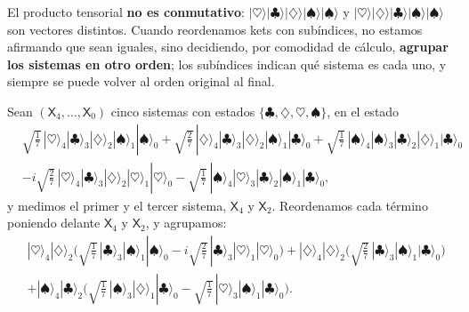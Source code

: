 \documentclass[11pt, a4paper, twoside, openright]{report}
\begin{document}
\begin{tcolorbox}[colback=blue!5!white,colframe=blue!75!black,title=\textbf{Atención: reordenar kets no es conmutar el producto tensorial}]
El producto tensorial \textbf{no es conmutativo}: $|\heartsuit\rangle|\clubsuit\rangle|\diamondsuit\rangle|\spadesuit\rangle|\spadesuit\rangle$ y $|\heartsuit\rangle|\diamondsuit\rangle|\clubsuit\rangle|\spadesuit\rangle|\spadesuit\rangle$ son vectores distintos. Cuando reordenamos kets con subíndices, no estamos afirmando que sean iguales, sino decidiendo, por comodidad de cálculo, \textbf{agrupar los sistemas en otro orden}; los subíndices indican qué sistema es cada uno, y siempre se puede volver al orden original al final.
\end{tcolorbox}

\begin{tcolorbox}[colback=cyan!5!white,colframe=cyan!75!black,title=\textbf{Ejemplo: Medición parcial de cinco sistemas}]
Sean $(\mathsf{X}_4,\dots,\mathsf{X}_0)$ cinco sistemas con estados $\{\clubsuit,\diamondsuit,\heartsuit,\spadesuit\}$, en el estado
\begin{align*}
&\sqrt{\tfrac17}\,|\heartsuit\rangle_4|\clubsuit\rangle_3|\diamondsuit\rangle_2|\spadesuit\rangle_1|\spadesuit\rangle_0 + \sqrt{\tfrac27}\,|\diamondsuit\rangle_4|\clubsuit\rangle_3|\diamondsuit\rangle_2|\spadesuit\rangle_1|\clubsuit\rangle_0 + \sqrt{\tfrac17}\,|\spadesuit\rangle_4|\spadesuit\rangle_3|\clubsuit\rangle_2|\diamondsuit\rangle_1|\clubsuit\rangle_0 \\
&- i\sqrt{\tfrac27}\,|\heartsuit\rangle_4|\clubsuit\rangle_3|\diamondsuit\rangle_2|\heartsuit\rangle_1|\heartsuit\rangle_0 - \sqrt{\tfrac17}\,|\spadesuit\rangle_4|\heartsuit\rangle_3|\clubsuit\rangle_2|\spadesuit\rangle_1|\clubsuit\rangle_0,
\end{align*}
y medimos el primer y el tercer sistema, $\mathsf{X}_4$ y $\mathsf{X}_2$. Reordenamos cada término poniendo delante $\mathsf{X}_4$ y $\mathsf{X}_2$, y agrupamos:
\begin{align*}
&|\heartsuit\rangle_4|\diamondsuit\rangle_2\Big(\sqrt{\tfrac17}\,|\clubsuit\rangle_3|\spadesuit\rangle_1|\spadesuit\rangle_0 - i\sqrt{\tfrac27}\,|\clubsuit\rangle_3|\heartsuit\rangle_1|\heartsuit\rangle_0\Big)
+ |\diamondsuit\rangle_4|\diamondsuit\rangle_2\Big(\sqrt{\tfrac27}\,|\clubsuit\rangle_3|\spadesuit\rangle_1|\clubsuit\rangle_0\Big) \\
&+ |\spadesuit\rangle_4|\clubsuit\rangle_2\Big(\sqrt{\tfrac17}\,|\spadesuit\rangle_3|\diamondsuit\rangle_1|\clubsuit\rangle_0 - \sqrt{\tfrac17}\,|\heartsuit\rangle_3|\spadesuit\rangle_1|\clubsuit\rangle_0\Big).

\end{align*}
\end{tcolorbox}
\end{document}
